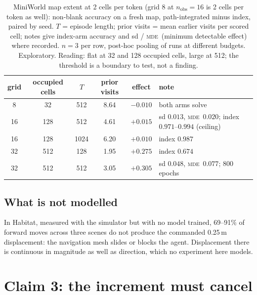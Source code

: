 \documentclass[10pt]{article}
\newcommand{\mde}{\textsc{mde}}
\begin{document}
\begin{table}[t]
\centering
\small
\captionsetup{font=footnotesize,skip=4pt}
\caption{MiniWorld map extent at 2 cells per token (grid 8 at $n_{\mathrm{obs}}=16$ is 2 cells per token as well): non-blank accuracy on a fresh map, path-integrated minus index, paired by seed. $T$ = episode length; prior visits = mean earlier visits per scored cell; notes give index-arm accuracy and sd / \mde\ (minimum detectable effect) where recorded. $n=3$ per row, post-hoc pooling of runs at different budgets. Exploratory. Reading: flat at 32 and 128 occupied cells, large at 512; the threshold is a boundary to test, not a finding.}
\label{tab:extent}
\begin{tabular}{@{}cccccl@{}}
\toprule
grid & occupied cells & $T$ & prior visits & effect & note \\
\midrule
8  & 32  & 512  & 8.64 & $-0.010$ & both arms solve \\
16 & 128 & 512  & 4.61 & $+0.015$ & sd $0.013$, \mde\ $0.020$; index $0.971$--$0.994$ (ceiling) \\
16 & 128 & 1024 & 6.20 & $+0.010$ & index $0.987$ \\
32 & 512 & 128  & 1.95 & $+0.275$ & index $0.674$ \\
32 & 512 & 512  & 3.05 & $+0.305$ & sd $0.048$, \mde\ $0.077$; 800 epochs \\
\bottomrule
\end{tabular}
\end{table}

\subsection{What is not modelled}
\label{sec:c2-habitat}

In Habitat, measured with the simulator but with no model trained, 69--91\% of forward moves across
three scenes do not produce the commanded 0.25\,m displacement: the navigation mesh slides or blocks
the agent. Displacement there is continuous in magnitude as well as direction, which no experiment
here models. %

\section{Claim 3: the increment must cancel}
\label{sec:claim3}
\end{document}
